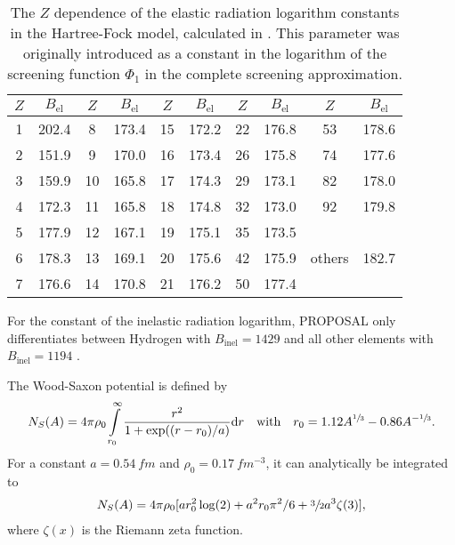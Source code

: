 \begin{table}
    \caption{The $Z$ dependence of the elastic radiation logarithm constants in the Hartree-Fock model, calculated in \cite{Kelner99RadLog}. This parameter was originally introduced as a constant in the logarithm of the screening function $\Phi_1$ in the complete screening approximation.}
    \label{tab:rad_log}
    \begin{center}
    \begin{tabular}{cc|cc|cc|cc|cc}
        \toprule
        $Z$ & $B_{\text{el}}$ & $Z$ & $B_{\text{el}}$ & $Z$ & $B_{\text{el}}$ & $Z$ & $B_{\text{el}}$ & $Z$ & $B_{\text{el}}$ \\
        \midrule
        1 & 202.4 & 8 & 173.4 & 15 & 172.2 & 22 & 176.8 & 53 & 178.6 \\
        2 & 151.9 & 9 & 170.0 & 16 & 173.4 & 26 & 175.8 & 74 & 177.6 \\
        3 & 159.9 & 10 & 165.8 & 17 & 174.3 & 29 & 173.1 & 82 & 178.0 \\
        4 & 172.3 & 11 & 165.8 & 18 & 174.8 & 32 & 173.0 & 92 & 179.8 \\
        5 & 177.9 & 12 & 167.1 & 19 & 175.1 & 35 & 173.5 & & \\
        6 & 178.3 & 13 & 169.1 & 20 & 175.6 & 42 & 175.9 & others & 182.7 \\
        7 & 176.6 & 14 & 170.8 & 21 & 176.2 & 50 & 177.4 & & \\
        \bottomrule
    \end{tabular}
    \end{center}
\end{table}
For the constant of the inelastic radiation logarithm, PROPOSAL only differentiates between Hydrogen with $B_{\text{inel}} = 1429$ and all other elements with $B_{\text{inel}} = 1194$ \cite{Tsai74, Tsai77}.

The Wood-Saxon potential is defined by \cite{Butkevich02}
\begin{align}
    N_S(A) = 4 \pi \rho_0 \int\limits_{r_0}^{\infty} \frac{r^2}{1+\exp((r-r_0)/a)} \mathrm{d} r
    \quad \text{with} \quad
    r_0 = 1.12 A^{\sfrac13} - 0.86 A^{-\sfrac13} .
\end{align}
For a constant $a = \SI{0.54}{fm}$ and $\rho_0 = \SI{0.17}{fm^{-3}}$, it can analytically be integrated to
\begin{align}
    N_S(A) = 4 \pi \rho_0 [a r_0^2\log(2) + a^2 r_0 \pi^2 / 6 + \sfrac32 a^3 \zeta(3)] ,
\end{align}
where $\zeta(x)$ is the Riemann zeta function.

